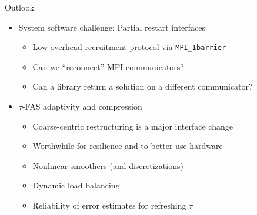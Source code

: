 \documentclass{beamer}
\begin{document}
\begin{frame}{Outlook}
  \begin{itemize}
  \item System software challenge: Partial restart interfaces
    \begin{itemize}
    \item Low-overhead recruitment protocol via \texttt{MPI\_Ibarrier}
    \item Can we ``reconnect'' MPI communicators?
    \item Can a library return a solution on a different communicator?
    \end{itemize}
  \item $\tau$-FAS adaptivity and compression
    \begin{itemize}
    \item Coarse-centric restructuring is a major interface change
    \item Worthwhile for resilience and to better use hardware
    \item Nonlinear smoothers (and discretizations)
    \item Dynamic load balancing
    \item Reliability of error estimates for refreshing $\tau$
    \end{itemize}
  \end{itemize}
\end{frame}
\end{document}
